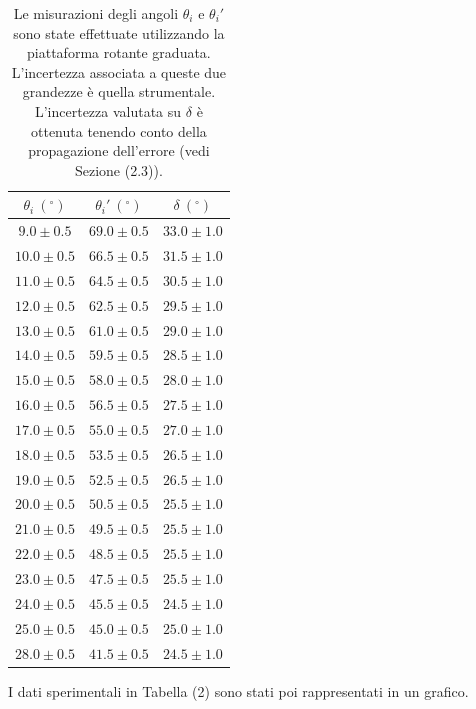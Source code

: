 \begin{table}[H]
	\centering
	\begin{tabular}{|c|c|c|}
		\hline
		$\theta_i \ (^\circ)$ & $\theta_i' \ (^\circ)$ & $\delta \ (^\circ)$ \\
		\hline
		$9.0\pm 0.5$ & $69.0\pm 0.5$ & $33.0\pm 1.0$ \\
		\hline
		$10.0\pm 0.5$ & $66.5\pm 0.5$ & $31.5\pm 1.0$ \\
		\hline
		$11.0\pm 0.5$ & $64.5\pm 0.5$ & $30.5\pm 1.0$ \\
		\hline
		$12.0\pm 0.5$ & $62.5\pm 0.5$ & $29.5\pm 1.0$ \\
		\hline
		$13.0\pm 0.5$ & $61.0\pm 0.5$ & $29.0\pm 1.0$ \\
		\hline
		$14.0\pm 0.5$ & $59.5\pm 0.5$ & $28.5\pm 1.0$ \\
		\hline
		$15.0\pm 0.5$ & $58.0\pm 0.5$ & $28.0\pm 1.0$ \\
		\hline
		$16.0\pm 0.5$ & $56.5\pm 0.5$ & $27.5\pm 1.0$ \\
		\hline
		$17.0\pm 0.5$ & $55.0\pm 0.5$ & $27.0\pm 1.0$ \\
		\hline
		$18.0\pm 0.5$ & $53.5\pm 0.5$ & $26.5\pm 1.0$ \\
		\hline
		$19.0\pm 0.5$ & $52.5\pm 0.5$ & $26.5\pm 1.0$ \\
		\hline
		$20.0\pm 0.5$ & $50.5\pm 0.5$ & $25.5\pm 1.0$ \\
		\hline
		$21.0\pm 0.5$ & $49.5\pm 0.5$ & $25.5\pm 1.0$ \\
		\hline
		$22.0\pm 0.5$ & $48.5\pm 0.5$ & $25.5\pm 1.0$ \\
		\hline
		$23.0\pm 0.5$ & $47.5\pm 0.5$ & $25.5\pm 1.0$ \\
		\hline
		$24.0\pm 0.5$ & $45.5\pm 0.5$ & $24.5\pm 1.0$ \\
		\hline
		$25.0\pm 0.5$ & $45.0\pm 0.5$ & $25.0\pm 1.0$ \\
		\hline
		$28.0\pm 0.5$ & $41.5\pm 0.5$ & $24.5\pm 1.0$ \\
		\hline
	\end{tabular}
	\captionsetup{width=0.7\linewidth}
	\caption{Le misurazioni degli angoli $\theta_i$ e $\theta_i'$ sono state effettuate utilizzando la piattaforma rotante graduata. L'incertezza associata a queste due grandezze è quella strumentale. L'incertezza valutata su $\delta$ è ottenuta tenendo conto della propagazione dell'errore (vedi Sezione (2.3)).}
	\label{tab:}
\end{table}

I dati sperimentali in Tabella (2) sono stati poi rappresentati in un grafico.


